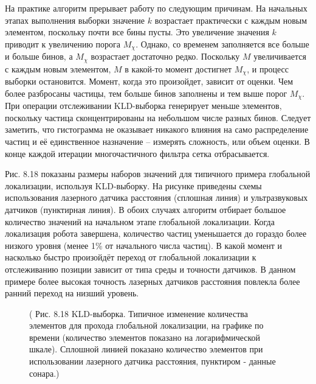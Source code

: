 \documentclass[10pt,a4paper]{article}
\begin{document}
На практике алгоритм прерывает работу по следующим причинам. На начальных этапах выполнения выборки значение $k$ возрастает практически с каждым новым элементом, поскольку почти все бины пусты. Это увеличение значения $k$ приводит к увеличению порога $M_\chi$. Однако, со временем заполняется все больше и больше бинов, а $M_\chi$ возрастает достаточно редко. Поскольку $M$ увеличивается с каждым новым элементом, $M$ в какой-то момент достигнет $M_\chi$, и процесс выборки остановится. Момент, когда это произойдет, зависит от оценки. Чем более разбросаны частицы, тем больше бинов заполнены и тем выше порог $M_\chi$. При операции отслеживании KLD-выборка генерирует меньше элементов, поскольку частица сконцентрированы на небольшом числе разных бинов. Следует заметить, что гистограмма не оказывает никакого влияния на само распределение частиц и её единственное назначение – измерять сложность, или объем оценки. В конце каждой итерации многочастичного фильтра сетка отбрасывается.

Рис. 8.18 показаны размеры наборов значений для типичного примера глобальной локализации, используя KLD-выборку. На рисунке приведены схемы использования лазерного датчика расстояния (сплошная линия) и ультразвуковых датчиков (пунктирная линия). В обоих случаях алгоритм отбирает большое количество значений на начальном этапе глобальной локализации. Когда локализация робота завершена, количество частиц уменьшается до гораздо более низкого уровня (менее 1\% от начального числа частиц). В какой момент и насколько быстро произойдёт переход от глобальной локализации к отслеживанию позиции зависит от типа среды и точности датчиков. В данном примере более высокая точность лазерных датчиков расстояния повлекла более ранний переход на низший уровень.

\begin{figure}[H]
	\caption{ ( Рис. 8.18 KLD-выборка. Типичное изменение количества элементов для прохода глобальной локализации, на графике по времени (количество элементов показано на логарифмической шкале). Сплошной линией показано количество элементов при использовании лазерного датчика расстояния,  пунктиром - данные сонара.)}
	\label{fig:818orig}
\end{figure}
\end{document}
